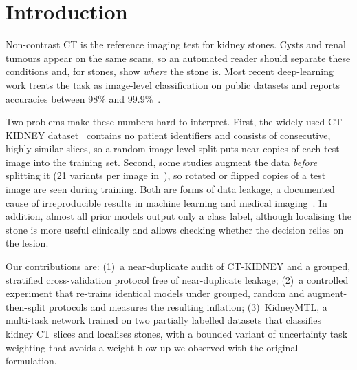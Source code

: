 \documentclass[conference]{IEEEtran}
\begin{document}
\section{Introduction}
Non-contrast CT is the reference imaging test for kidney stones. Cysts and renal tumours appear on the same
scans, so an automated reader should separate these conditions and, for stones, show \emph{where} the stone is.
Most recent deep-learning work treats the task as image-level classification on public datasets and reports
accuracies between 98\% and 99.9\%~\cite{islam2022vision,devi2025cdr,yildirim2021deep}.

Two problems make these numbers hard to interpret. First, the widely used CT-KIDNEY dataset~\cite{islam2022vision}
contains no patient identifiers and consists of consecutive, highly similar slices, so a random image-level split
puts near-copies of each test image into the training set. Second, some studies augment the data
\emph{before} splitting it (21 variants per image in~\cite{devi2025cdr}), so rotated or flipped copies of a test
image are seen during training. Both are forms of data leakage, a documented cause of irreproducible results in
machine learning and medical imaging~\cite{kapoor2023leakage,roberts2021pitfalls,varoquaux2022failures}.
In addition, almost all prior models output only a class label, although localising the stone is more useful
clinically and allows checking whether the decision relies on the lesion.

Our contributions are:
(1)~a near-duplicate audit of CT-KIDNEY and a grouped, stratified cross-validation protocol free of
near-duplicate leakage;
(2)~a controlled experiment that re-trains identical models under grouped, random and augment-then-split
protocols and measures the resulting inflation;
(3)~KidneyMTL, a multi-task network trained on two partially labelled datasets that classifies kidney CT
slices and localises stones, with a bounded variant of uncertainty task weighting that avoids a weight
blow-up we observed with the original formulation.

\end{document}
